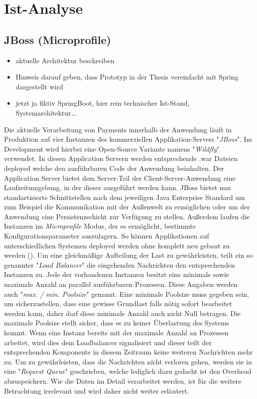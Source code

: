 \chapter{Ist-Analyse}

\section{JBoss (Microprofile)}
\begin{itemize}
  \item aktuelle Architektur beschreiben
  \item Hinweis darauf geben, dass Prototyp in der Thesis vereinfacht mit Spring dargestellt wird
  \item jetzt ja fiktiv SpringBoot, hier rein technischer Ist-Stand, Systemarchitektur….
\end{itemize}

Die aktuelle Verarbeitung von Payments innerhalb der Anwendung läuft in Produktion auf vier Instanzen des kommerziellen Applikation-Servers "\emph{JBoss}". Im Development wird hierbei eine Open-Source Variante namens "\emph{Wildfly}" verwendet. In diesen Application Servern werden entsprechende .war Dateien deployed welche den ausführbaren Code der Anwendung beinhalten. Der Application Server bietet dem Server-Teil der Client-Server-Anwendung eine Laufzeitumgebung, in der dieser ausgeführt werden kann. JBoss bietet nun standartisierte Schnittstellen nach dem jeweiligen Java Enterprise Standard um zum Beispiel die Kommunikation mit der Außenwelt zu ermöglichen oder um der Anwendung eine Persistenzschicht zur Verfügung zu stellen. Außerdem laufen die Instanzen im \emph{Microprofile} Modus, der es ermöglicht, bestimmte Konfigurationsparameter auszulagern. So können Applikationen auf unterschiedlichen Systemen deployed werden ohne komplett neu gebaut zu werden (\cite{microprofile}). Um eine gleichmäßige Aufteilung der Last zu gewährleisten, teilt ein so genannter "\emph{Load Balancer}" die eingehenden Nachrichten den entsprechenden Instanzen zu. Jede der vorhandenen Instanzen besitzt eine minimale sowie maximale Anzahl an parallel ausführbaren Prozessen. Diese Angaben werden auch "\emph{max. / min. Poolsize}" genannt. Eine minimale Poolsize muss gegeben sein, um sicherzustellen, dass eine gewisse Grundlast falls nötig sofort bearbeitet werden kann, daher darf diese minimale Anzahl auch nicht Null betragen. Die maximale Poolsize stellt sicher, dass es zu keiner Überlastung des Systems kommt. Wenn eine Instanz bereits mit der maximale Anzahl an Prozessen arbeitet, wird dies dem Loadbalancer signalisiert und dieser teilt der entsprechenden Komponente in diesem Zeitraum keine weiteren Nachrichten mehr zu. Um zu gewährleisten, dass die Nachrichten nicht verloren gehen, werden sie in eine "\emph{Request Queue}" geschrieben, welche lediglich dazu gedacht ist den Overhead abzuspeichern. Wie die Daten im Detail verarbeitet werden, ist für die weitere Betrachtung irrelevant und wird daher nicht weiter erläutert.

